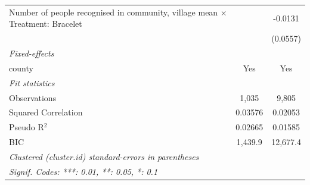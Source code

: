 \documentclass[
]{article}
\begin{document}
\begin{table}
\begin{tabular}{lcc}
   Number of people recognised in community, village mean $\times$ Treatment: Bracelet  &               & -0.0131\\   
                                                                                        &               & (0.0557)\\   
   \midrule
   \emph{Fixed-effects}\\
   county                                                                               & Yes           & Yes\\  
   \midrule
   \emph{Fit statistics}\\
   Observations                                                                         & 1,035         & 9,805\\  
   Squared Correlation                                                                  & 0.03576       & 0.02053\\  
   Pseudo R$^2$                                                                         & 0.02665       & 0.01585\\  
   BIC                                                                                  & 1,439.9       & 12,677.4\\  
   \midrule \midrule
   \multicolumn{3}{l}{\emph{Clustered (cluster.id) standard-errors in parentheses}}\\
   \multicolumn{3}{l}{\emph{Signif. Codes: ***: 0.01, **: 0.05, *: 0.1}}\\
\end{tabular}
\par\endgroup


\end{table}
\end{document}
